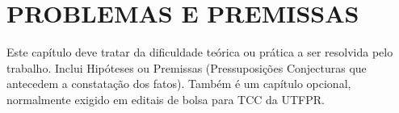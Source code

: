 
\chapter{PROBLEMAS E PREMISSAS}
\label{chap:problemas}

Este capítulo deve tratar da dificuldade teórica ou prática a ser resolvida pelo trabalho. Inclui Hipóteses ou Premissas (Pressuposições \/Conjecturas que antecedem a constatação dos fatos). Também é um capítulo opcional, normalmente exigido em editais de bolsa para TCC da UTFPR.
